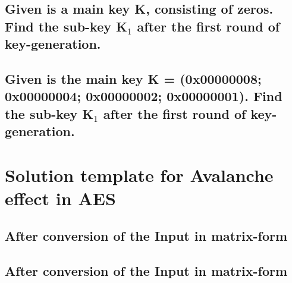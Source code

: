 \subsection{Given is a main key K, consisting of zeros. Find the sub-key K$_{1}$ after the first round of key-generation.}
\label{section:5a}

\subsection{Given is the main key K = (0x00000008; 0x00000004; 0x00000002; 0x00000001). Find the sub-key K$_{1}$ after the first round of key-generation.}
\label{section:5b}


\section{Solution template for Avalanche effect in AES}

\subsection{After conversion of the Input in matrix-form}
\label{section:6a}

\subsection{After conversion of the Input in matrix-form}
\label{section:6b}
